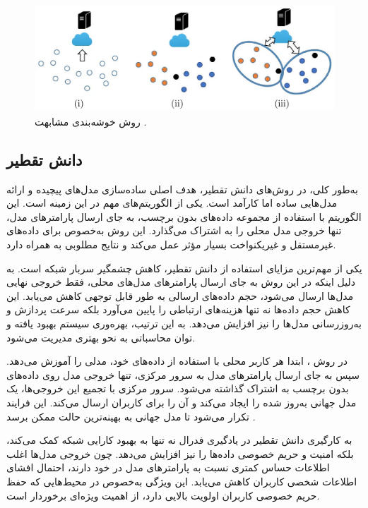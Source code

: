 \begin{figure}[t]
	\centering
	\includegraphics[scale=0.9]{images/chap3/similarity_clustering.png}%
	\caption{%
		روش خوشه‌بندی مشابهت 
		\cite{ghosh2019robust}%
		.
	}
	\label{similarity_clustering}
	\centering
\end{figure}

\subsection{
	دانش تقطیر%
}
به‌طور کلی، در روش‌های دانش تقطیر، هدف اصلی ساده‌سازی مدل‌های پیچیده و ارائه مدل‌هایی ساده اما کارآمد است. یکی از الگوریتم‌های مهم در این زمینه
%
است. این الگوریتم با استفاده از مجموعه داده‌های بدون برچسب، به جای ارسال پارامترهای مدل، تنها خروجی مدل محلی را به اشتراک می‌گذارد. این روش به‌خصوص برای داده‌های غیرمستقل و غیریکنواخت بسیار مؤثر عمل می‌کند و نتایج مطلوبی به همراه دارد.

یکی از مهم‌ترین مزایای استفاده از دانش تقطیر، کاهش چشمگیر سربار شبکه است. به دلیل اینکه در این روش به جای ارسال پارامترهای مدل‌های محلی، فقط خروجی نهایی مدل‌ها ارسال می‌شود، حجم داده‌های ارسالی به طور قابل توجهی کاهش می‌یابد. این کاهش حجم داده‌ها نه تنها هزینه‌های ارتباطی را پایین می‌آورد بلکه سرعت پردازش و به‌روزرسانی مدل‌ها را نیز افزایش می‌دهد. به این ترتیب، بهره‌وری سیستم بهبود یافته و توان محاسباتی به نحو بهتری مدیریت می‌شود.

در روش
%
، ابتدا هر کاربر محلی با استفاده از داده‌های خود، مدلی را آموزش می‌دهد. سپس به جای ارسال پارامترهای مدل به سرور مرکزی، تنها خروجی مدل روی داده‌های بدون برچسب به اشتراک گذاشته می‌شود. سرور مرکزی با تجمیع این خروجی‌ها، یک مدل جهانی به‌روز شده را ایجاد می‌کند و آن را برای کاربران ارسال می‌کند. این فرایند تکرار می‌شود تا مدل جهانی به بهینه‌ترین حالت ممکن برسد
\cite{itahara2021distillation}.

به کارگیری دانش تقطیر در یادگیری فدرال نه تنها به بهبود کارایی شبکه کمک می‌کند، بلکه امنیت و حریم خصوصی داده‌ها را نیز افزایش می‌دهد. چون خروجی مدل‌ها اغلب اطلاعات حساس کمتری نسبت به پارامترهای مدل در خود دارند، احتمال افشای اطلاعات شخصی کاربران کاهش می‌یابد. این ویژگی به‌خصوص در محیط‌هایی که حفظ حریم خصوصی کاربران اولویت بالایی دارد، از اهمیت ویژه‌ای برخوردار است.

